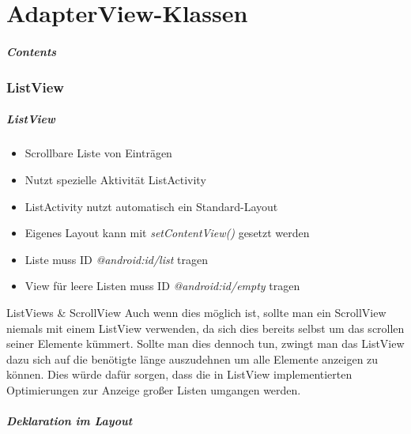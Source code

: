 \part{AdapterView-Klassen}
\frame{\partpage}
\begin{frame}
	\frametitle{Contents}
	\tableofcontents[]
\end{frame}

\section{ListView}
\begin{frame}[label=listview]
   \frametitle{ListView}
   \begin{itemize}
      \item Scrollbare Liste von Einträgen
      \item Nutzt spezielle Aktivität ListActivity
      \item ListActivity nutzt automatisch ein Standard-Layout
      \item Eigenes Layout kann mit \emph{setContentView()} gesetzt werden
      \item Liste muss ID \emph{@android:id/list} tragen
      \item View für leere Listen muss ID \emph{@android:id/empty} tragen
   \end{itemize}

   \begin{alertblock}{ListViews \& ScrollView}
		Auch wenn dies möglich ist, sollte man ein ScrollView niemals mit einem ListView 
		verwenden, da sich dies bereits selbst um das scrollen seiner Elemente kümmert. 
		Sollte man dies dennoch tun, zwingt man das ListView dazu sich auf die benötigte 
		länge auszudehnen um alle Elemente anzeigen zu können. Dies würde dafür sorgen, 
		dass die in ListView implementierten Optimierungen zur Anzeige großer Listen 
		umgangen werden.
   \end{alertblock}
\end{frame}

\begin{frame}
   \frametitle{Deklaration im Layout}
   
\end{frame}

